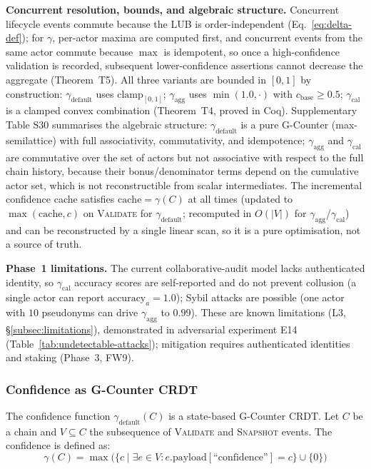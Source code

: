 \textbf{Concurrent resolution, bounds, and algebraic structure.} Concurrent lifecycle events commute because the LUB is order-independent (Eq.~\ref{eq:delta-def}); for $\gamma$, per-actor maxima are computed first, and concurrent events from the same actor commute because $\max$ is idempotent, so once a high-confidence validation is recorded, subsequent lower-confidence assertions cannot decrease the aggregate (Theorem~T5). All three variants are bounded in $[0,1]$ by construction: $\gamma_{\text{default}}$ uses $\text{clamp}_{[0,1]}$; $\gamma_{\text{agg}}$ uses $\min(1.0, \cdot)$ with $c_{\text{base}} \geq 0.5$; $\gamma_{\text{cal}}$ is a clamped convex combination (Theorem~T4, proved in Coq). Supplementary Table S30 summarises the algebraic structure: $\gamma_{\text{default}}$ is a pure G-Counter (max-semilattice) with full associativity, commutativity, and idempotence; $\gamma_{\text{agg}}$ and $\gamma_{\text{cal}}$ are commutative over the set of actors but not associative with respect to the full chain history, because their bonus/denominator terms depend on the cumulative actor set, which is not reconstructible from scalar intermediates. The incremental confidence cache satisfies $\text{cache} = \gamma(C)$ at all times (updated to $\max(\text{cache}, c)$ on \textsc{Validate} for $\gamma_{\text{default}}$; recomputed in $O(|V|)$ for $\gamma_{\text{agg}}$/$\gamma_{\text{cal}}$) and can be reconstructed by a single linear scan, so it is a pure optimisation, not a source of truth.

\textbf{Phase~1 limitations.} The current collaborative-audit model lacks authenticated identity, so $\gamma_{\text{cal}}$ accuracy scores are self-reported and do not prevent collusion (a single actor can report $\text{accuracy}_a = 1.0$); Sybil attacks are possible (one actor with $10$ pseudonyms can drive $\gamma_{\text{agg}}$ to $0.99$). These are known limitations (L3, \S\ref{subsec:limitations}), demonstrated in adversarial experiment E14 (Table~\ref{tab:undetectable-attacks}); mitigation requires authenticated identities and staking (Phase~3, FW9).

\subsubsection{Confidence as G-Counter CRDT}\label{subsubsec:confidence-gcounter}

The confidence function $\gamma_{\text{default}}(C)$ is a state-based G-Counter CRDT. Let $C$ be a chain and $V \subseteq C$ the subsequence of \textsc{Validate} and \textsc{Snapshot} events. The confidence is defined as:
\begin{equation}\label{eq:confidence-gcounter}
    \gamma(C) = \max\bigl(\{c \mid \exists e \in V : e.\text{payload}[\text{``confidence''}] = c\} \cup \{0\}\bigr)
\end{equation}

